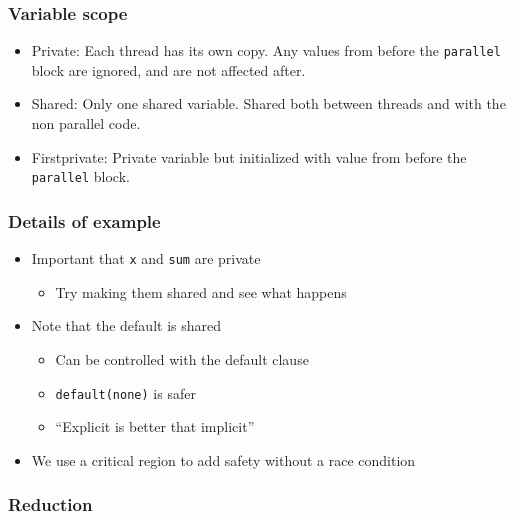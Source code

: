 \subsubsection{Variable scope}\label{variable-scope}

\begin{itemize}
\itemsep1pt\parskip0pt
\item
  Private: Each thread has its own copy. Any values from before the
  \texttt{parallel} block are ignored, and are not affected after.
\item
  Shared: Only one shared variable. Shared both between threads and with
  the non parallel code.
\item
  Firstprivate: Private variable but initialized with value from before
  the \texttt{parallel} block.
\end{itemize}

\subsubsection{Details of example}\label{details-of-example}

\begin{itemize}
\itemsep1pt\parskip0pt
\item
  Important that \texttt{x} and \texttt{sum} are private

  \begin{itemize}
  \itemsep1pt\parskip0pt
  \item
    Try making them shared and see what happens
  \end{itemize}
\item
  Note that the default is shared

  \begin{itemize}
  \itemsep1pt\parskip0pt
  \item
    Can be controlled with the default clause
  \item
    \texttt{default(none)} is safer
  \item
    ``Explicit is better that implicit''
  \end{itemize}
\item
  We use a critical region to add safety without a race condition
\end{itemize}

\subsubsection{Reduction}\label{reduction}

